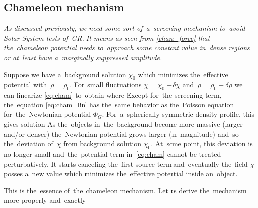 \subsection{Chameleon mechanism}
{\itshape
As discussed previously, we need some sort of~a~screening mechanism to~avoid Solar System tests of~GR. It means as seen from \eqref{cham_force} that the~chameleon potential needs to~approach some constant value in~dense regions or at~least have a~marginally suppressed amplitude.

Suppose we have a~background solution $\chi_0$ which minimizes the~effective potential with~$\rho=\rho_0$. For~small fluctuations $\chi=\chi_0+\delta\chi$ and~$\rho=\rho_0+\delta\rho$ we can linearize \eqref{eq:cham} to~obtain
where
Except for~the~screening term, the~equation \eqref{eq:cham_lin} has the~same behavior as the~Poisson equation for~the~Newtonian potential $\Phi_G$. For~a~spherically symmetric density profile, this gives solution
As the~objects in~the~background become more massive (larger and/or denser) the~Newtonian potential grows larger (in~magnitude) and~so the~deviation of~$\chi$ from background solution $\chi_0$. At~some point, this deviation is no longer small and~the~potential term in~\eqref{eq:cham} cannot be treated perturbatively. It starts canceling the~first source term and~eventually the~field $\chi$ posses a~new value which minimizes the~effective potential inside an~object.

This is the~essence of~the~chameleon mechanism. Let us derive the~mechanism more properly and~exactly.
} 
